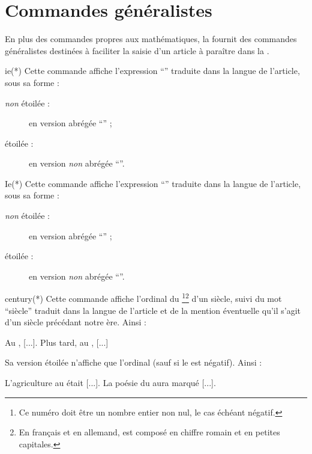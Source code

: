 \documentclass[french,nolocaltoc]{nwejmart}
\newtheorem[title=Fait,style=definition]{fact}
\begin{document}
\section{Commandes généralistes}
\label{sec:comm-gener}

En plus des commandes propres aux mathématiques, la \nwejmauthorcl{} fournit des
commandes généralistes destinées à faciliter la saisie d'un article à paraître
dans la \nwejm{}.

\begin{docCommand}{ie(*)}{}
  Cette commande affiche l'expression \enquote{\ie*{}} traduite dans la langue
  de l'article, sous sa forme :
  \begin{description}
  \item[\emph{non} étoilée :] en version abrégée \enquote{\ie{}} ;
  \item[étoilée :] en version \emph{non} abrégée \enquote{\ie*{}}.
  \end{description}
\end{docCommand}

\begin{docCommand}{Ie(*)}{}
  Cette commande affiche l'expression \enquote{\Ie*{}} traduite dans la langue
  de l'article, sous sa forme :
  \begin{description}
  \item[\emph{non} étoilée :] en version abrégée \enquote{\Ie{}} ;
  \item[étoilée :] en version \emph{non} abrégée \enquote{\Ie*{}}.
  \end{description}
\end{docCommand}

\begin{docCommand}{century(*)}{}
  Cette commande affiche l'ordinal du \footnote{Ce numéro doit être
    un nombre entier non nul, le cas échéant négatif.}\footnote{En français et en
    allemand,  est composé en chiffre romain et en petites
    capitales.} d'un siècle, suivi du mot \enquote{siècle} traduit dans la
  langue de l'article et de la mention éventuelle qu'il s'agit d'un siècle
  précédant notre ère. Ainsi :
\begin{bodycode}
Au , [...]. Plus tard, au , [...]
\end{bodycode}
  Sa version étoilée n'affiche que l'ordinal (sauf si le  est
  négatif). Ainsi :
\begin{bodycode}
L'agriculture au  était [...].
La poésie du  aura marqué [...].
\end{bodycode}
\end{docCommand}
\end{document}
